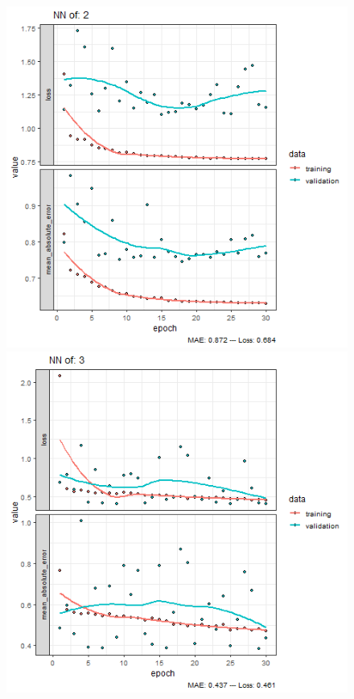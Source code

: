 \documentclass{FR16}
\begin{document}
\begin{figure}[!htb]
\begin{minipage}{0.33\textwidth}
     \includegraphics[width=1\linewidth]{figures/NN-2.png}
   \end{minipage}
   \begin{minipage}{0.33\textwidth}
     \centering
     \includegraphics[width=1\linewidth]{figures/NN-3.png} 

\end{minipage}
\end{figure}
\end{document}
